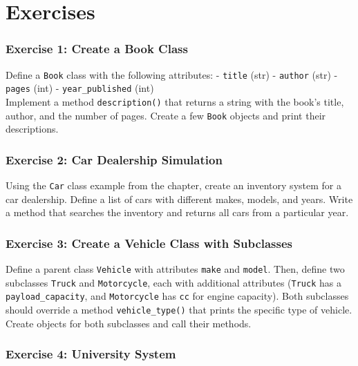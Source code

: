 \documentclass[
  letterpaper,
  DIV=11,
  numbers=noendperiod]{scrreprt}
\begin{document}
\hypertarget{exercises-12}{%
\section{Exercises}\label{exercises-12}}

\hypertarget{exercise-1-create-a-book-class}{%
\subsubsection{Exercise 1: Create a Book
Class}\label{exercise-1-create-a-book-class}}

Define a \texttt{Book} class with the following attributes: -
\texttt{title} (str) - \texttt{author} (str) - \texttt{pages} (int) -
\texttt{year\_published} (int)\\
Implement a method \texttt{description()} that returns a string with the
book's title, author, and the number of pages. Create a few
\texttt{Book} objects and print their descriptions.

\hypertarget{exercise-2-car-dealership-simulation}{%
\subsubsection{Exercise 2: Car Dealership
Simulation}\label{exercise-2-car-dealership-simulation}}

Using the \texttt{Car} class example from the chapter, create an
inventory system for a car dealership. Define a list of cars with
different makes, models, and years. Write a method that searches the
inventory and returns all cars from a particular year.

\hypertarget{exercise-3-create-a-vehicle-class-with-subclasses}{%
\subsubsection{Exercise 3: Create a Vehicle Class with
Subclasses}\label{exercise-3-create-a-vehicle-class-with-subclasses}}

Define a parent class \texttt{Vehicle} with attributes \texttt{make} and
\texttt{model}. Then, define two subclasses \texttt{Truck} and
\texttt{Motorcycle}, each with additional attributes (\texttt{Truck} has
a \texttt{payload\_capacity}, and \texttt{Motorcycle} has \texttt{cc}
for engine capacity). Both subclasses should override a method
\texttt{vehicle\_type()} that prints the specific type of vehicle.
Create objects for both subclasses and call their methods.

\hypertarget{exercise-4-university-system}{%
\subsubsection{Exercise 4: University
System}\label{exercise-4-university-system}}
\end{document}
